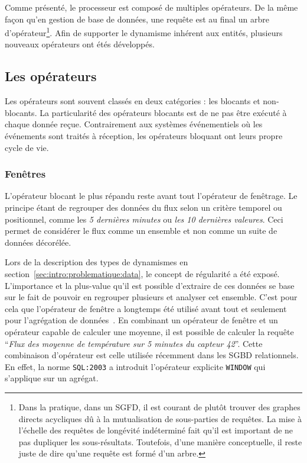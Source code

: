 Comme présenté, le processeur est composé de multiples opérateurs. De la même façon qu'en gestion de base de données, une requête est au final un arbre d'opérateur\footnote{Dans la pratique, dans un SGFD, il est courant de plutôt trouver des graphes directs acycliques dû à la mutualisation de sous-parties de requêtes. La mise à l'échelle des requêtes de longévité indéterminé fait qu'il est important de ne pas dupliquer les sous-résultats. Toutefois, d'une manière conceptuelle, il reste juste de dire qu'une requête est formé d'un arbre.}.
Afin de supporter le dynamisme inhérent aux entités, plusieurs nouveaux opérateurs ont étés développés.

\subsection{Les opérateurs}
Les opérateurs sont souvent classés en deux catégories : les blocants et non-blocants. La particularité des opérateurs blocants est de ne pas être exécuté à chaque donnée reçue. Contrairement aux systèmes événementiels où les événements sont traités à réception, les opérateurs bloquant ont leurs propre cycle de vie.
\subsubsection{Fenêtres}
L'opérateur blocant le plus répandu reste avant tout l'opérateur de fenêtrage. Le principe étant de regrouper des données du flux selon un critère temporel ou positionnel, comme les \textit{5 dernières minutes} ou \textit{les 10 dernières valeures}. Ceci permet de considérer le flux comme un ensemble et non comme un suite de données décorélée.

Lors de la description des types de dynamismes en section~\ref{sec:intro:problematique:data}, le concept de régularité a été exposé. L'importance et la plus-value qu'il est possible d'extraire de ces données se base sur le fait de pouvoir en regrouper plusieurs et analyser cet ensemble. C'est pour cela que l'opérateur de fenêtre a longtemps été utilisé avant tout et seulement pour l'agrégation de données~\cite{Madden:tag, Abadi:aurora}. En combinant un opérateur de fenêtre et un opérateur capable de calculer une moyenne, il est possible de calculer la requête \enquote{\it Flux des moyenne de température sur 5 minutes du capteur 42}. Cette combinaison d'opérateur est celle utilisée récemment dans les SGBD relationnels. En effet, la norme \verb|SQL:2003| a introduit l'opérateur explicite \verb|WINDOW| qui s'applique sur un agrégat.

